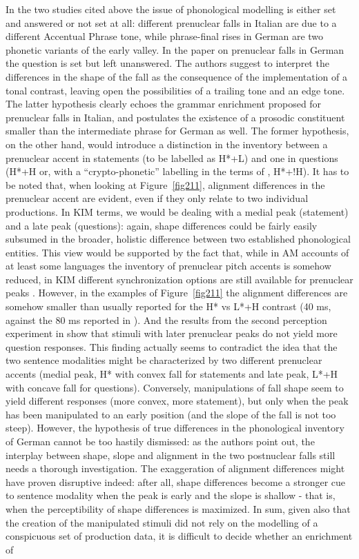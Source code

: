 In the two studies cited above the issue of phonological modelling is either set and answered or not set at all: different prenuclear falls in Italian are due to a different Accentual Phrase tone, while phrase-final rises in German are two phonetic variants of the early valley. In the paper on prenuclear falls in German \citep{petrone2014intonation} the question is set but left unanswered. The authors suggest to interpret the differences in the shape of the fall as the consequence of the implementation of a tonal contrast, leaving open the possibilities of a trailing tone and an edge tone. The latter hypothesis clearly echoes the grammar enrichment proposed for prenuclear falls in Italian, and postulates the existence of a prosodic constituent smaller than the intermediate phrase for German as well. The former hypothesis, on the other hand, would introduce a distinction in the inventory between a prenuclear accent in statements (to be labelled as H*+L) and one in questions (H*+H or, with a ``crypto-phonetic'' labelling in the terms of \citealt{atterer2004phonetics}, H*+!H). It has to be noted that, when looking at Figure~\ref{fig211}, alignment differences in the prenuclear accent are evident, even if they only relate to two individual productions. In KIM terms, we would be dealing with a medial peak (statement) and a late peak (questions): again, shape differences could be fairly easily subsumed in the broader, holistic difference between two established phonological entities. This view would be supported by the fact that, while in AM accounts of at least some languages the inventory of prenuclear pitch accents is somehow reduced, in KIM different synchronization options are still available for prenuclear peaks \citep{niebuhr2006alignment}. However, in the examples of Figure~\ref{fig211} the alignment differences are somehow smaller than usually reported for the H* vs L*+H contrast (40 ms, against the 80 ms reported in \citealt{niebuhr2006alignment}). And the results from the second perception experiment in \citet{petrone2014intonation} show that stimuli with later prenuclear peaks do not yield more question responses. This finding actually seems to contradict the idea that the two sentence modalities might be characterized by two different prenuclear accents (medial peak, H* with convex fall for statements and late peak, L*+H with concave fall for questions). Conversely, manipulations of fall shape seem to yield different responses (more convex, more statement), but only when the peak has been manipulated to an early position (and the slope of the fall is not too steep). However, the hypothesis of true differences in the phonological inventory of German cannot be too hastily dismissed: as the authors point out, the interplay between shape, slope and alignment in the two postnuclear falls still needs a thorough investigation. The exaggeration of alignment differences might have proven disruptive indeed: after all, shape differences become a stronger cue to sentence modality when the peak is early and the slope is shallow - that is, when the perceptibility of shape differences is maximized. In sum, given also that the creation of the manipulated stimuli did not rely on the modelling of a conspicuous set of production data, it is difficult to decide whether an enrichment of 